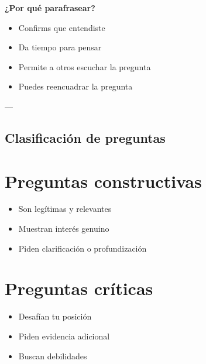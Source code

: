 \documentclass[a4paper,11pt]{article}
\begin{document}
\vspace{0.2cm}

\textbf{¿Por qué parafrasear?}

\begin{itemize}

  \item Confirms que entendiste

  \item Da tiempo para pensar

  \item Permite a otros escuchar la pregunta

  \item Puedes reencuadrar la pregunta

\end{itemize}

\vspace{0.2cm}

---

\vspace{0.2cm}

\subsection{Clasificación de preguntas}

\vspace{0.2cm}

\section{Preguntas constructivas}

\begin{itemize}

  \item Son legítimas y relevantes

  \item Muestran interés genuino

  \item Piden clarificación o profundización

\end{itemize}

\vspace{0.2cm}

\section{Preguntas críticas}

\begin{itemize}

  \item Desafían tu posición

  \item Piden evidencia adicional

  \item Buscan debilidades

\end{itemize}
\end{document}
